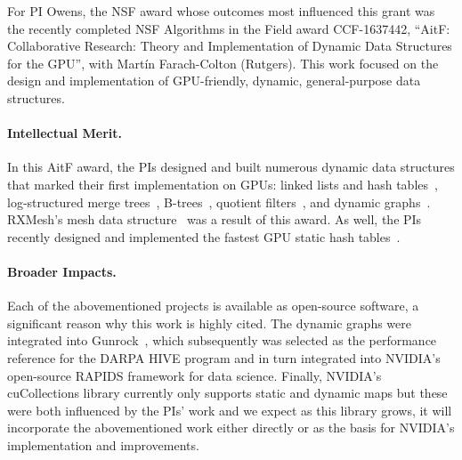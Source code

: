 For PI Owens, the NSF award whose outcomes most influenced this grant was the recently completed NSF Algorithms in the Field award CCF-1637442, ``AitF: Collaborative Research: Theory and Implementation of Dynamic Data Structures for the GPU'', with Mart\'{i}n Farach-Colton (Rutgers). This work focused on the design and implementation of GPU-friendly, dynamic, general-purpose data structures.

\paragraph{Intellectual Merit.} In this AitF award, the PIs designed and built numerous dynamic data structures that marked their first implementation on GPUs: linked lists and hash tables~\cite{Ashkiani:2018:ADH}, log-structured merge trees~\cite{Ashkiani:2018:GLA}, B-trees~\cite{Awad:2019:EAH}, quotient filters~\cite{Geil:2018:QFA}, and dynamic graphs~\cite{Awad:2020:DGO}. RXMesh's mesh data structure~\cite{Mahmoud:2021:RAG} was a result of this award. As well, the PIs recently designed and implemented the fastest GPU static hash tables~\cite{Awad:2023:AAI}.

\paragraph{Broader Impacts.} Each of the abovementioned projects is available as open-source software, a significant reason why this work is highly cited. The dynamic graphs were integrated into Gunrock~\cite{Awad:2020:DGO,Wang:2017:GGG}, which subsequently was selected as the performance reference for the DARPA HIVE program and in turn integrated into NVIDIA's open-source RAPIDS framework for data science. Finally, NVIDIA's cuCollections library currently only supports static and dynamic maps but these were both influenced by the PIs' work and we expect as this library grows, it will incorporate the abovementioned work either directly or as the basis for NVIDIA's implementation and improvements.


